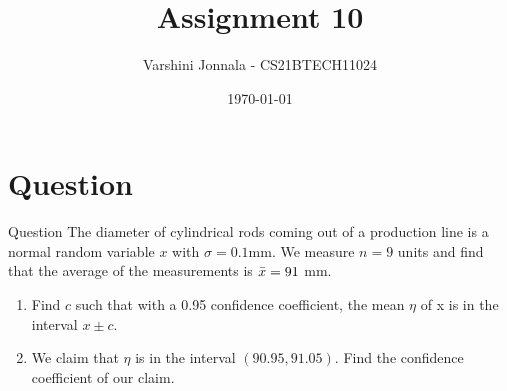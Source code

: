\documentclass{beamer}
\title{Assignment 10}
\author{Varshini Jonnala - CS21BTECH11024}
\date{\today}
\providecommand{\brak}[1]{\ensuremath{\left(#1\right)}}
\begin{document}
\begin{frame}
    \titlepage 
\end{frame}

\section{Question}
\begin{frame}{Question}
The diameter of cylindrical rods coming out of a production line is a normal random variable $x$ with $\sigma = 0.1$mm. We measure $n = 9$ units and find that the average of the measurements is $\Bar{x} = 91$ mm.
    \begin{enumerate}[label=(\alph*)]
        \item Find $c$ such that with a 0.95 confidence coefficient, the mean $\eta$ of x is in the interval $x\pm c$.
        \item We claim that $\eta$ is in the interval $\brak{90.95, 91.05}$. Find the confidence coefficient of our claim.  
    \end{enumerate}
\end{frame}

\end{document}
